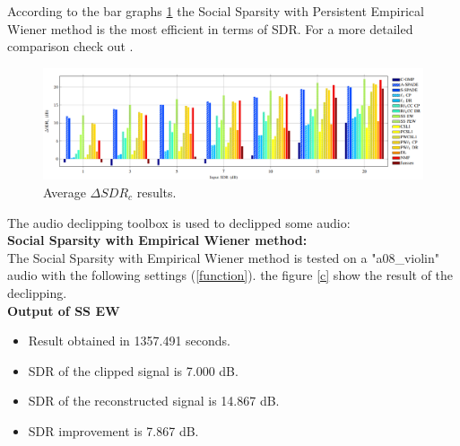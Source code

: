 \documentclass{article}
\numberwithin{dummy}{section}
\begin{document}
According to the bar graphs \ref{vdd} the Social Sparsity with Persistent Empirical Wiener method is the most efficient in terms of SDR. For a more detailed comparison check out \cite{záviška2020survey}.

\begin{figure}[ht!]
    \centering
    \includegraphics[scale=0.6]{figures/vd.PNG}
    \caption{Average $\Delta SDR_c$ results. \cite{záviška2020survey}}
    \label{vdd}
\end{figure}
The audio declipping toolbox is used to declipped some audio:\\
\textbf{Social Sparsity with Empirical Wiener method:}\\
The Social Sparsity with Empirical Wiener method is tested on a "a08\_violin" audio with the following settings (\ref{function}). the figure \ref{c} show the result of the declipping.\\
\textbf{Output of SS EW}
\begin{itemize}
    \item Result obtained in 1357.491 seconds.
    \item SDR of the clipped signal is 7.000 dB.
    \item SDR of the reconstructed signal is 14.867 dB.
    \item SDR improvement is 7.867 dB.
\end{itemize}
\end{document}

